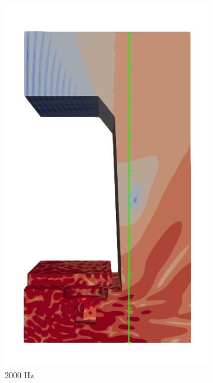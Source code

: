 \begin{figure}[H]
\begin{subfigure}[b]{0.3\textwidth}
		\includegraphics[width=\linewidth]{fig/chap5/freq_steps/field_result_2000Hz.png}
		\caption{2000 Hz}
	\end{subfigure}
	\hfill
	\begin{subfigure}[b]{0.3\textwidth}
		\centering

\end{subfigure}
\end{figure}
